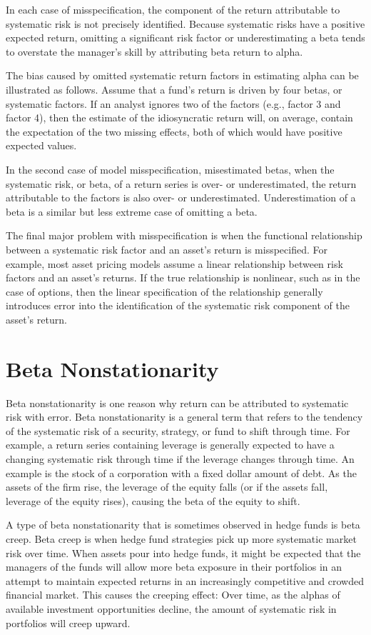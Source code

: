 \documentclass[11pt]{article}
\begin{document}
In each case of misspecification, the component of the return attributable to systematic risk is not precisely identified. Because systematic risks have a positive expected return, omitting a significant risk factor or underestimating a beta tends to overstate the manager's skill by attributing beta return to alpha.

The bias caused by omitted systematic return factors in estimating alpha can be illustrated as follows. Assume that a fund's return is driven by four betas, or systematic factors. If an analyst ignores two of the factors (e.g., factor 3 and factor 4), then the estimate of the idiosyncratic return will, on average, contain the expectation of the two missing effects, both of which would have positive expected values.

In the second case of model misspecification, misestimated betas, when the systematic risk, or beta, of a return series is over- or underestimated, the return attributable to the factors is also over- or underestimated. Underestimation of a beta is a similar but less extreme case of omitting a beta.

The final major problem with misspecification is when the functional relationship between a systematic risk factor and an asset's return is misspecified. For example, most asset pricing models assume a linear relationship between risk factors and an asset's returns. If the true relationship is nonlinear, such as in the case of options, then the linear specification of the relationship generally introduces error into the identification of the systematic risk component of the asset's return.

\section*{Beta Nonstationarity}
Beta nonstationarity is one reason why return can be attributed to systematic risk with error. Beta nonstationarity is a general term that refers to the tendency of the systematic risk of a security, strategy, or fund to shift through time. For example, a return series containing leverage is generally expected to have a changing systematic risk through time if the leverage changes through time. An example is the stock of a corporation with a fixed dollar amount of debt. As the assets of the firm rise, the leverage of the equity falls (or if the assets fall, leverage of the equity rises), causing the beta of the equity to shift.

A type of beta nonstationarity that is sometimes observed in hedge funds is beta creep. Beta creep is when hedge fund strategies pick up more systematic market risk over time. When assets pour into hedge funds, it might be expected that the managers of the funds will allow more beta exposure in their portfolios in an attempt to maintain expected returns in an increasingly competitive and crowded financial market. This causes the creeping effect: Over time, as the alphas of available investment opportunities decline, the amount of systematic risk in portfolios will creep upward.
\end{document}
